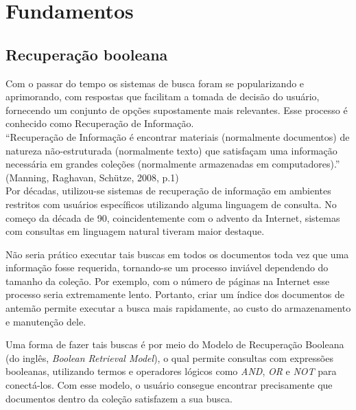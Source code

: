 \chapter{Fundamentos}
\label{cap:fundamentos}


\section{Recuperação booleana}
\label{sec:recuperacao_booleana}

Com o passar do tempo os sistemas de busca foram se popularizando e aprimorando, com respostas que facilitam a tomada de decisão do usuário, fornecendo um conjunto de opções supostamente mais relevantes. Esse processo é conhecido como Recuperação de Informação. \\

``Recuperação de Informação é encontrar materiais (normalmente documentos) de natureza não-estruturada (normalmente texto) que satisfaçam uma informação necessária em grandes coleções (normalmente armazenadas em computadores).'' (Manning, Raghavan, Schütze, 2008, p.1) \\

Por décadas, utilizou-se sistemas de recuperação de informação em ambientes restritos com usuários específicos utilizando alguma linguagem de consulta. No começo da década de 90, coincidentemente com o advento da Internet, sistemas com consultas em linguagem natural tiveram maior destaque.

Não seria prático executar tais buscas em todos os documentos toda vez que uma informação fosse requerida, tornando-se um processo inviável dependendo do tamanho da coleção. Por exemplo, com o número de páginas na Internet esse processo seria extremamente lento. Portanto, criar um índice dos documentos de antemão permite executar a busca mais rapidamente, ao custo do armazenamento e manutenção dele.

Uma forma de fazer tais buscas é por meio do Modelo de Recuperação Booleana (do inglês, \emph{Boolean Retrieval Model}), o qual permite consultas com expressões booleanas, utilizando termos e operadores lógicos como \emph{AND}, \emph{OR} e \emph{NOT} para conectá-los. Com esse modelo, o usuário consegue encontrar precisamente que documentos dentro da coleção satisfazem a sua busca.

